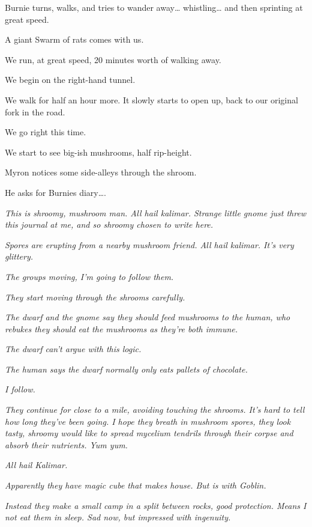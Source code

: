 Burnie turns, walks, and tries to wander away… whistling… and then sprinting at great speed.\medskip

A giant Swarm of rats comes with us.\medskip

We run, at great speed, 20 minutes worth of walking away.\medskip

We begin on the right-hand tunnel.\medskip

We walk for half an hour more. It slowly starts to open up, back to our original fork in the road.\medskip

We go right this time.\medskip

We start to see big-ish mushrooms, half rip-height.\medskip

Myron notices some side-alleys through the shroom.\medskip

He asks for Burnies diary….\medskip

\textit{This is shroomy, mushroom man. All hail kalimar. Strange little gnome just threw this journal at me, and so shroomy chosen to write here.}\medskip

\textit{Spores are erupting from a nearby mushroom friend. All hail kalimar. It’s very glittery.}\medskip

\textit{The groups moving, I’m going to follow them.}\medskip

\textit{They start moving through the shrooms carefully.}\medskip

\textit{The dwarf and the gnome say they should feed mushrooms to the human, who rebukes they should eat the mushrooms as they’re both immune.}\medskip

\textit{The dwarf can’t argue with this logic.}\medskip

\textit{The human says the dwarf normally only eats pallets of chocolate.}\medskip

\textit{I follow.}\medskip

\textit{They continue for close to a mile, avoiding touching the shrooms. It’s hard to tell how long they’ve been going. I hope they breath in mushroom spores, they look tasty, shroomy would like to spread mycelium tendrils through their corpse and absorb their nutrients. Yum yum.}\medskip

\textit{All hail Kalimar.}\medskip

\textit{Apparently they have magic cube that makes house. But is with Goblin.}\medskip

\textit{Instead they make a small camp in a split between rocks, good protection. Means I not eat them in sleep. Sad now, but impressed with ingenuity.}\medskip

